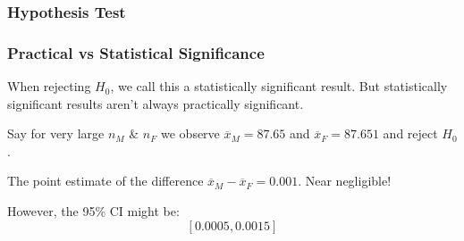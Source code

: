 \documentclass[handout]{beamer}
\newcommand{\blue}[1]{\textcolor{blue2}{#1}}
\newcommand{\xbar}{\overline{x}}
\begin{document}
\begin{frame}[fragile]
\frametitle{Hypothesis Test}
%
%
%
%

\end{frame}


\begin{frame}
\frametitle{Practical vs Statistical Significance}
When rejecting $H_0$, we call this a \blue{statistically significant} result.  But statistically significant results aren't always \blue{practically significant}.

\pause\vspace{0.5cm}

Say for \blue{very} large $n_M$ \& $n_F$ we observe $\xbar_M = 87.65$ and $\xbar_F = 87.651$ and reject $H_0$.  

\pause\vspace{0.5cm}

The point estimate of the difference $\xbar_M - \xbar_F = 0.001$.  Near negligible!  

\pause\vspace{0.5cm}

However, the 95\% CI might be:
\[
[0.0005, 0.0015]
\]

\end{frame}
\end{document}
